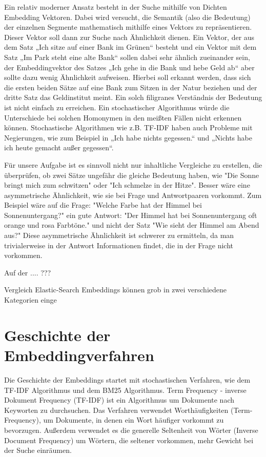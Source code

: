Ein relativ moderner Ansatz besteht in der Suche mithilfe von Dichten Embedding Vektoren. 
Dabei wird versucht, die Semantik (also die Bedeutung) der einzelnen Segmente mathematisch mithilfe eines Vektors zu repräsentieren. 
Dieser Vektor soll dann zur Suche nach Ähnlichkeit dienen. 
Ein Vektor, der aus dem Satz „Ich sitze auf einer Bank im Grünen“ besteht und ein Vektor mit dem Satz „Im Park steht eine alte Bank“ sollen dabei sehr ähnlich zueinander sein, der Embeddingvektor des Satzes „Ich gehe in die Bank und hebe Geld ab“ aber sollte dazu wenig Ähnlichkeit aufweisen. 
Hierbei soll erkannt werden, dass sich die ersten beiden Sätze auf eine Bank zum Sitzen in der Natur beziehen und der dritte Satz das Geldinstitut meint. 
Ein solch filigranes Verständnis der Bedeutung ist nicht einfach zu erreichen. 
Ein stochastischer Algorithmus würde die Unterschiede bei solchen Homonymen in den meißten Fällen nicht erkennen können. 
Stochastische Algorithmen wie z.B. TF-IDF haben auch Probleme mit Negierungen, wie zum Beispiel in „Ich habe nichts gegessen.“ und „Nichts habe ich heute gemacht außer gegessen“.

Für unsere Aufgabe ist es sinnvoll nicht nur inhaltliche Vergleiche zu erstellen, die überprüfen, ob zwei Sätze ungefähr die gleiche Bedeutung haben, wie "Die Sonne bringt mich zum schwitzen" oder "Ich schmelze in der Hitze".
Besser wäre eine asymmetrische Ähnlichkeit, wie sie bei Frage und Antwortpaaren vorkommt.
Zum Beispiel wäre auf die Frage: "Welche Farbe hat der Himmel bei Sonnenuntergang?" ein gute Antwort: "Der Himmel hat bei Sonnenuntergang oft orange und rosa Farbtöne."  und nicht der Satz "Wie sieht der Himmel am Abend aus?"
Diese asymmetrische Ähnlichkeit ist schwerer zu ermitteln, da man trivialerweise in der Antwort Informationen findet, die in der Frage nicht vorkommen.

Auf der .... ??? 

Vergleich Elastic-Search
Embeddings können grob in zwei verschiedene Kategorien einge

\section{Geschichte der Embeddingverfahren}

Die Geschichte der Embeddings startet mit stochastischen Verfahren, wie dem TF-IDF Algorithmus und dem BM25 Algorithmus. 
Term Frequency - inverse Dokument Frequency (TF-IDF) ist ein Algorithmus um Dokumente nach Keyworten zu durchsuchen.
Das Verfahren verwendet Worthäufigkeiten (Term-Frequency), um Dokumente, in denen ein Wort häufiger vorkommt zu bevorzugen.
Außerdem verwendet es die generelle Seltenheit von Wörter (Inverse Document Frequency) um Wörtern, die seltener vorkommen, mehr Gewicht bei der Suche einräumen.

